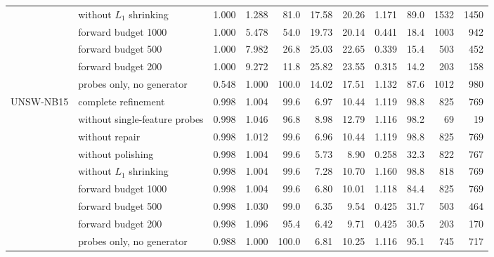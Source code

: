 \begin{table}[t]
{\begin{tabular}{@{}llrrrrrrrrr@{}}
 & without $L_1$ shrinking & 1.000 & 1.288 & 81.0 & 17.58 & 20.26 & 1.171 & 89.0 & 1532 & 1450 \\
 & forward budget 1000 & 1.000 & 5.478 & 54.0 & 19.73 & 20.14 & 0.441 & 18.4 & 1003 & 942 \\
 & forward budget 500 & 1.000 & 7.982 & 26.8 & 25.03 & 22.65 & 0.339 & 15.4 & 503 & 452 \\
 & forward budget 200 & 1.000 & 9.272 & 11.8 & 25.82 & 23.55 & 0.315 & 14.2 & 203 & 158 \\
 & probes only, no generator & 0.548 & 1.000 & 100.0 & 14.02 & 17.51 & 1.132 & 87.6 & 1012 & 980 \\
\midrule
UNSW-NB15 & complete refinement & 0.998 & 1.004 & 99.6 & 6.97 & 10.44 & 1.119 & 98.8 & 825 & 769 \\
 & without single-feature probes & 0.998 & 1.046 & 96.8 & 8.98 & 12.79 & 1.116 & 98.2 & 69 & 19 \\
 & without repair & 0.998 & 1.012 & 99.6 & 6.96 & 10.44 & 1.119 & 98.8 & 825 & 769 \\
 & without polishing & 0.998 & 1.004 & 99.6 & 5.73 & 8.90 & 0.258 & 32.3 & 822 & 767 \\
 & without $L_1$ shrinking & 0.998 & 1.004 & 99.6 & 7.28 & 10.70 & 1.160 & 98.8 & 818 & 769 \\
 & forward budget 1000 & 0.998 & 1.004 & 99.6 & 6.80 & 10.01 & 1.118 & 84.4 & 825 & 769 \\
 & forward budget 500 & 0.998 & 1.030 & 99.0 & 6.35 & 9.54 & 0.425 & 31.7 & 503 & 464 \\
 & forward budget 200 & 0.998 & 1.096 & 95.4 & 6.42 & 9.71 & 0.425 & 30.5 & 203 & 170 \\
 & probes only, no generator & 0.988 & 1.000 & 100.0 & 6.81 & 10.25 & 1.116 & 95.1 & 745 & 717 \\
\bottomrule
\end{tabular}}
\end{table}
